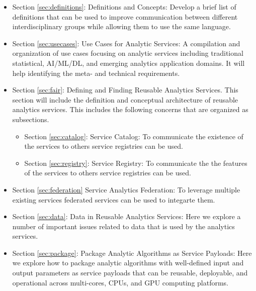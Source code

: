 \begin{itemize}
  
\item Section \ref{sec:definitions}: Definitions and Concepts: Develop
  a brief list of definitions that can be used to improve
  communication between different interdisciplinary groups while
  allowing them to use the same language.

\item Section \ref{sec:usecases}: Use Cases for Analytic Services:
  A compilation and organization of use cases focusing on analytic
  services including traditional statistical, AI/ML/DL, and emerging
  analytics application domains. It will help identifying the meta-
  and technical requirements.

\item Section \ref{sec:fair}: Defining and Finding Reusable Analytics
  Services. This section 
  will include the definition and conceptual architecture of reusable
  analytics services. This includes the following concerns that are
  organized as subsections.

 \begin{itemize}

    \item Section \ref{sec:catalog}: Service Catalog: To communicate
      the existence of the services to others service registries can
      be used.

    \item Section \ref{sec:registry}: Service Registry: To communicate
      the the features of the services to others service registries
      can be used.

\end{itemize}

\item Section \ref{sec:federation} Service Analytics Federation: To leverage multiple
existing services federated services can be used to integarte them.

\item Section \ref{sec:data}: Data in Reusable Analytics Services:
  Here we explore a number of important issues related to data that is
  used by the analytics services.

\item Section \ref{sec:package}: Package Analytic Algorithms as
  Service Payloads: Here we explore how to package analytic algorithms
  with well-defined input and output parameters as service payloads
  that can be reusable, deployable, and operational across
  multi-cores, CPUs, and GPU computing platforms.


\end{itemize}
